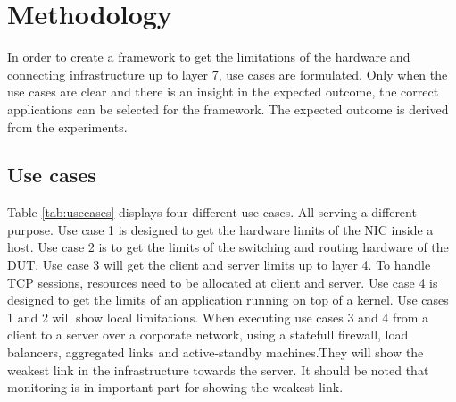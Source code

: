 \chapter{Methodology}\label{ch:method}

In order to create a framework to get the limitations of the hardware and connecting infrastructure up to layer 7, use cases are formulated.
Only when the use cases are clear and there is an insight in the expected outcome, the correct applications can be selected for the framework.
The expected outcome is derived from the experiments. 

\section{Use cases}\label{sec:usecase}

Table \ref{tab:usecases} displays four different use cases. All serving a different purpose.
Use case 1 is designed to get the hardware limits of the NIC inside a host. Use case 2 is to get the limits of the  switching and routing hardware of the DUT.
Use case 3 will get the client and server limits up to layer 4. To handle TCP sessions, resources need to be allocated at client and server. 
Use case 4 is designed to get the limits of an application running on top of a kernel.  
Use cases 1 and 2 will show local limitations. 
When executing use cases 3 and 4 from a client to a server over a corporate network, using a statefull firewall, load balancers, aggregated links and active-standby machines.They will show the weakest link in the infrastructure towards the server.  
It should be noted that monitoring is in important part for showing the weakest link. 

